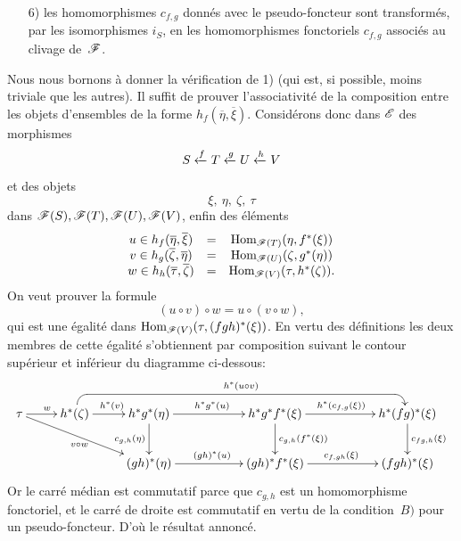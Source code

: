 \begin{enumerate}
$f=\id_S$, en d'autres termes, l'ensemble des $\alpha_f(\xi)$
d\'efinit un \emph{ clivage normalisé de~$\cal{F}$ sur}
$\cal{E}$. De plus, par construction, on a commutativit\'e dans le
diagramme de foncteurs
$$
\xymatrix{{\cal{F}(S)}\ar[r]^{f^*}\ar[d]_{i_S}&{\cal{F}(T)}\ar[d]^{i_T}\\{\cal{F}_S}\ar[r]^{f^*_{\cal{F}}}&{\cal{F}_T}}
$$
o\`u $f^*_{\cal{F}}$ est le foncteur image inverse par $f$, relatif
au clivage consid\'er\'e sur~$\cal{F}$. Enfin:
\item[6)] les homomorphismes $c_{f,g}$ donn\'es avec le
pseudo-foncteur sont transform\'es, par les isomorphismes $i_S$, en
les homomorphismes fonctoriels $c_{f,g}$ associ\'es au clivage
de~$\cal{F}$.
\end{enumerate}

Nous nous bornons \`a donner la v\'erification de 1) (qui est, si
possible, moins triviale que les autres). Il suffit de prouver
l'associativit\'e de la composition entre les objets d'ensembles de
la forme $h_f(\overline{\eta},\overline{\xi})$. Consid\'erons donc
dans $\cal{E}$ des morphismes
$$
S\xleftarrow{f} T\xleftarrow{g} U\xleftarrow{h} V
$$
et des objets
$$
\xi,\ \eta,\ \zeta,\ \tau
$$
dans $\cal{F}(S),\cal{F}(T),\cal{F}(U),\cal{F}(V)$, enfin des
\'el\'ements
$$
\begin{array}{ccc}
u\in
h_f(\overline{\eta},\overline{\xi})&=&\Hom_{\cal{F}(T)}(\eta,f^*(\xi))\\
v\in
h_g(\overline{\zeta},\overline{\eta})&=&\Hom_{\cal{F}(U)}(\zeta,g^*(\eta))\\
w\in
h_h(\overline{\tau},\overline{\zeta})&=&\Hom_{\cal{F}(V)}(\tau,h^*(\zeta)).
\end{array}
$$
On
veut prouver la formule
$$
(u\circ v)\circ w = u\circ (v\circ w),
$$
qui est une \'egalit\'e dans
$\Hom_{\cal{F}(V)}(\tau,(fgh)^*(\xi))$. En vertu des d\'efinitions
les deux membres de cette \'egalit\'e s'obtiennent par composition
suivant le contour sup\'erieur et inf\'erieur du diagramme
ci-dessous:
$$
\xymatrix{
\tau \ar[r]^w \ar[drr]_{v\circ w} & h^*(\zeta)
\ar[r]^{h^*(v)} \ar@<-2pt>
`u[rrrrr] `[rrrrr]^{h^*(u\circ v)} [rrrrr] & h^*g^*(\eta)
\ar[rr]^{h^*g^*(u)}
\ar[d]_{c_{g,h}(\eta)} & & h^*g^*f^*(\xi) \ar[rr]^{h^*(c_{f,g}(\xi))}
\ar[d]^{c_{g,h}(f^*(\xi))} & & h^*(fg)^*(\xi) \ar[d]^{c_{fg,h}(\xi)} \\
& & (gh)^*(\eta) \ar[rr]^{(gh)^*(u)} & & (gh)^*f^*(\xi)
\ar[rr]^{c_{f,gh}(\xi)} & & (fgh)^*(\xi) }
$$
Or le carr\'e m\'edian est commutatif parce que $c_{g,h}$ est un
homomorphisme fonctoriel, et le carr\'e de droite est commutatif en
vertu de la condition~$B)$ pour un pseudo-foncteur. D'o\`u le
r\'esultat annonc\'e.

